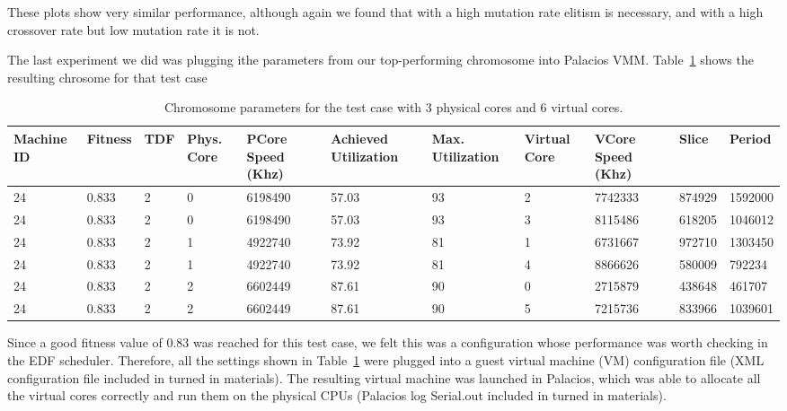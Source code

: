 \documentclass[11pt]{article}
\begin{document}
These plots show very similar performance, although again we found that with a high mutation rate elitism is necessary, and with a high crossover rate but low mutation rate it is not.

The last experiment we did was plugging ithe parameters from our top-performing chromosome into Palacios VMM. Table~\ref{tab:table1} shows the resulting chrosome for that test case

\begin{table}[H]
\centering
\begin{footnotesize}
\renewcommand{\arraystretch}{1.2}

 \begin{tabularx}{17cm}{ | X | X | X | X | X | X | X | X | X | X | X |}
 \hline
Machine ID & Fitness & TDF  & Phys. Core & PCore Speed (Khz) & Achieved Utilization & Max. Utilization & Virtual Core& VCore Speed (Khz) & Slice & Period \\ \hline

24 & 0.833 & 2 & 0 & 6198490 & 57.03 & 93 & 2 & 7742333 & 874929 & 1592000 \\ \hline
24 & 0.833 & 2 & 0 & 6198490 & 57.03 & 93 & 3 & 8115486 & 618205 & 1046012 \\ \hline

24 & 0.833 & 2 & 1 & 4922740 & 73.92 & 81 & 1 & 6731667 & 972710 & 1303450 \\ \hline
24 & 0.833 & 2 & 1 & 4922740 & 73.92 & 81 & 4 & 8866626 & 580009 & 792234 \\ \hline

24 & 0.833 & 2 & 2 & 6602449 & 87.61 & 90 & 0 & 2715879 & 438648 & 461707 \\ \hline
24 & 0.833 & 2 & 2 & 6602449 & 87.61 & 90 & 5 & 7215736 & 833966 & 1039601 \\ \hline

\end{tabularx}
\caption{Chromosome parameters for the test case with 3 physical cores and 6 virtual cores.} \label{tab:table1}
\end{footnotesize}
\end{table}

Since a good fitness value of 0.83 was reached for this test case, we felt this was a configuration whose performance was worth checking in the EDF scheduler. Therefore, all the settings shown in Table~\ref{tab:table1} were plugged into a guest virtual machine (VM) configuration file (XML configuration file included in turned in materials). The resulting virtual machine was launched in Palacios, which was able to allocate all the virtual cores correctly and run them on the physical CPUs (Palacios log Serial.out included in turned in materials). 
\end{document}
